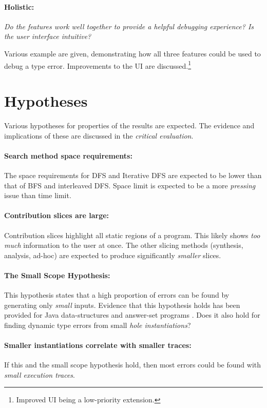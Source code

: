 \paragraph{Holistic: } \textit{Do the features work well together to provide a helpful debugging experience? Is the user interface intuitive?}

Various example are given, demonstrating how all three features could be used to debug a type error. Improvements to the UI are discussed.\footnote{Improved UI being a low-priority extension.} 



\section{Hypotheses}
Various hypotheses for properties of the results are expected. The evidence and implications of these are discussed in the \textit{critical evaluation}.

\paragraph{Search method space requirements: } The space requirements for DFS and Iterative DFS are expected to be lower than that of BFS and interleaved DFS. Space limit is expected to be a more \textit{pressing} issue than time limit.

\paragraph{Contribution slices are large: } Contribution slices highlight all static regions of a program. This likely shows \textit{too much} information to the user at once. The other slicing methods (synthesis, analysis, ad-hoc) are expected to produce significantly \textit{smaller} slices. 

\paragraph{The Small Scope Hypothesis: } This hypothesis states that a high proportion of errors can be found by generating only \textit{small} inputs. Evidence that this hypothesis holds has been provided for Java data-structures \cite{SmallScopeHypothesis} and answer-set programs \cite{SmallScopeHypothesisAnswerSet}. Does it also hold for finding dynamic type errors from small \textit{hole instantiations}?

\paragraph{Smaller instantiations correlate with smaller traces: } If this and the small scope hypothesis hold, then most errors could be found with \textit{small execution traces}.

